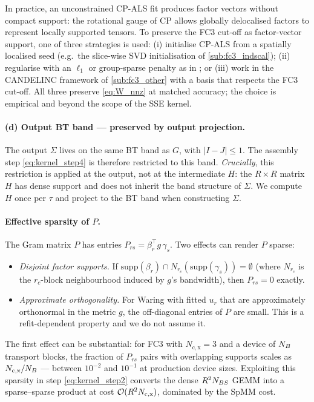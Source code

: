 In practice, an unconstrained CP-ALS fit produces factor vectors
without compact support: the rotational gauge of CP allows globally
delocalised factors to represent locally supported tensors. To
preserve the FC3 cut-off as factor-vector support, one of three
strategies is used: (i) initialise CP-ALS from a spatially localised
seed (e.g.\ the slice-wise SVD initialisation of
\cref{sub:fc3_indscal}); (ii) regularise with an $\ell_1$ or
group-sparse penalty as in
\cite{papalexakis_parcube_2012, kim_sparse_2007}; or (iii) work in
the CANDELINC framework of \cref{sub:fc3_other} with a basis that
respects the FC3 cut-off. All three preserve \cref{eq:W_nnz} at
matched accuracy; the choice is empirical and beyond the scope of
the SSE kernel.

\paragraph{(d) Output BT band — preserved by output projection.}
The output $\Sigma$ lives on the same BT band as $G$, with
$|I-J|\le 1$. The assembly step \cref{eq:kernel_step4} is therefore
restricted to this band. \emph{Crucially}, this restriction is
applied at the output, not at the intermediate $H$: the $R\times R$
matrix $H$ has dense support and does not inherit the band structure
of $\Sigma$. We compute $H$ once per $\tau$ and project to the BT
band when constructing $\Sigma$.

\paragraph{Effective sparsity of $P$.}
The Gram matrix $P$ has entries $P_{rs} = \beta_r^{\!\top} g\,\gamma_s$.
Two effects can render $P$ sparse:
\begin{itemize}
  \item \emph{Disjoint factor supports.} If
    $\mathrm{supp}(\beta_r)\cap N_{r_c}(\mathrm{supp}(\gamma_s))=\emptyset$
    (where $N_{r_c}$ is the $r_c$-block neighbourhood induced by $g$'s
    bandwidth), then $P_{rs}=0$ exactly.
  \item \emph{Approximate orthogonality.} For Waring with
    fitted $u_r$ that are approximately orthonormal in the metric
    $g$, the off-diagonal entries of $P$ are small. This is a
    refit-dependent property and we do not assume it.
\end{itemize}
The first effect can be substantial: for FC3 with $N_\mathrm{c,x}=3$
and a device of $N_{B}$ transport blocks, the fraction of $P_{rs}$
pairs with overlapping supports scales as
$N_\mathrm{c,x}/N_{B}$ — between $10^{-2}$ and $10^{-1}$ at production
device sizes. Exploiting this sparsity in step
\cref{eq:kernel_step2} converts the dense $R^{2}N_{BS}$ GEMM into a
sparse--sparse product at cost $\mathcal{O}(R^{2}N_\mathrm{c,x})$, dominated
by the SpMM cost.

